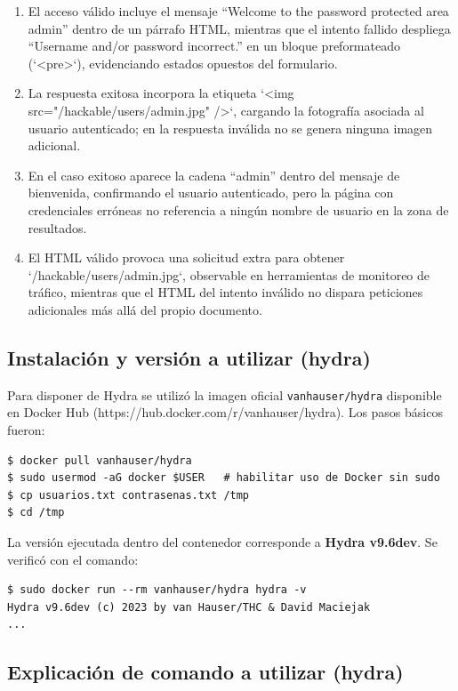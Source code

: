 \documentclass[letterpaper,12pt]{article}
\let\origsubsection\subsection
\renewcommand{\subsection}{\FloatBarrier\origsubsection}
\begin{document}
\begin{enumerate}
    \item El acceso válido incluye el mensaje ``Welcome to the password protected area admin'' dentro de un párrafo HTML, mientras que el intento fallido despliega ``Username and/or password incorrect.'' en un bloque preformateado (`<pre>`), evidenciando estados opuestos del formulario.
    \item La respuesta exitosa incorpora la etiqueta `<img src="/hackable/users/admin.jpg" />`, cargando la fotografía asociada al usuario autenticado; en la respuesta inválida no se genera ninguna imagen adicional.
    \item En el caso exitoso aparece la cadena ``admin'' dentro del mensaje de bienvenida, confirmando el usuario autenticado, pero la página con credenciales erróneas no referencia a ningún nombre de usuario en la zona de resultados.
    \item El HTML válido provoca una solicitud extra para obtener `/hackable/users/admin.jpg`, observable en herramientas de monitoreo de tráfico, mientras que el HTML del intento inválido no dispara peticiones adicionales más allá del propio documento.
\end{enumerate}

\subsection{Instalación y versión a utilizar (hydra)}
Para disponer de Hydra se utilizó la imagen oficial \texttt{vanhauser/hydra} disponible en Docker Hub (https://hub.docker.com/r/vanhauser/hydra). Los pasos básicos fueron:
\begin{verbatim}
$ docker pull vanhauser/hydra
$ sudo usermod -aG docker $USER   # habilitar uso de Docker sin sudo
$ cp usuarios.txt contrasenas.txt /tmp
$ cd /tmp
\end{verbatim}

La versión ejecutada dentro del contenedor corresponde a \textbf{Hydra v9.6dev}. Se verificó con el comando:
\begin{verbatim}
$ sudo docker run --rm vanhauser/hydra hydra -v
Hydra v9.6dev (c) 2023 by van Hauser/THC & David Maciejak
...
\end{verbatim}

\subsection{Explicación de comando a utilizar (hydra)}
\end{document}

